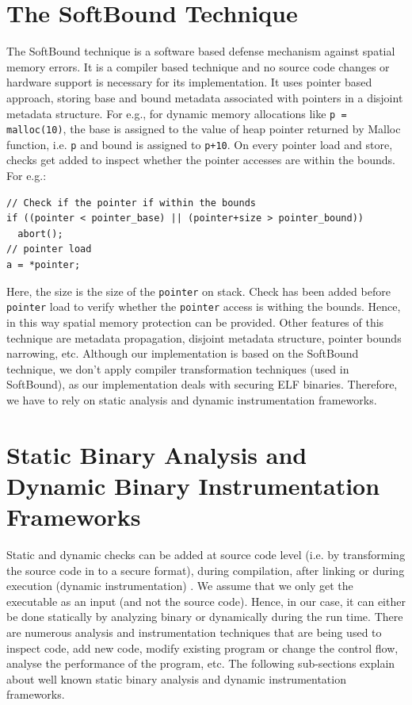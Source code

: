 \section{The SoftBound Technique}
The SoftBound \citep{nagarakatte2009softbound} technique is a software based defense mechanism against spatial memory errors. It is a compiler based technique and no source code changes or hardware support is necessary for its implementation. It uses pointer based approach, storing base and bound metadata associated with pointers in a disjoint metadata structure. For e.g., for dynamic memory allocations like \texttt{p = malloc(10)}, the base is assigned to the value of heap pointer returned by Malloc function, i.e. \texttt{p} and bound is assigned to \texttt{p+10}. On every pointer load and store, checks get added to inspect whether the pointer accesses are within the bounds. For e.g.:
\begin{lstlisting}
// Check if the pointer if within the bounds
if ((pointer < pointer_base) || (pointer+size > pointer_bound))
  abort();
// pointer load
a = *pointer;
\end{lstlisting}
Here, the size is the size of the \texttt{pointer} on stack. Check has been added before \texttt{pointer} load to verify whether the \texttt{pointer} access is withing the bounds. Hence, in this way spatial memory protection can be provided. Other features of this technique are metadata propagation, disjoint metadata structure, pointer bounds narrowing, etc. Although our implementation is based on the SoftBound technique, we don't apply compiler transformation techniques (used in SoftBound), as our implementation deals with securing ELF binaries. Therefore, we have to rely on static analysis and dynamic instrumentation frameworks.

\section{Static Binary Analysis and Dynamic Binary Instrumentation Frameworks}

Static and dynamic checks can be added at source code level (i.e. by transforming the source code in to a secure format), during compilation, after linking or during execution (dynamic instrumentation) \citep{luk2005pin}. We assume that we only get the executable as an input (and not the source code). Hence, in our case, it can either be done statically by analyzing binary or dynamically during the run time. There are numerous analysis and instrumentation techniques that are being used to inspect code, add new code, modify existing program or change the control flow, analyse the performance of the program, etc. The following sub-sections explain about well known static binary analysis and dynamic instrumentation frameworks.

